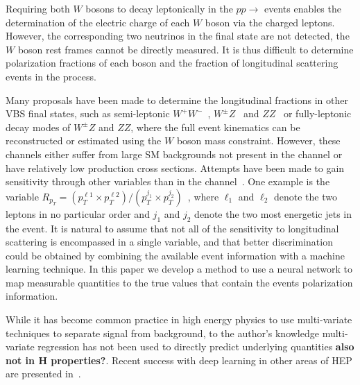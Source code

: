Requiring both $W$ bosons to decay leptonically in the $pp
\to$ \ssWW events enables the determination of the electric charge of
each $W$ boson via the charged leptons. However, the
corresponding two neutrinos in the final state are not detected, the
$W$ boson rest frames cannot be directly measured.  It is thus
difficult to determine polarization fractions of each boson and
the fraction of longitudinal scattering events in the \ssWW process.

Many proposals have been made to determine the longitudinal fractions in other VBS final states, such as semi-leptonic
$W^+W^-$~\cite{Han:2009em}, $W^\pm Z$~\cite{aa} and $ZZ$~\cite{le houche report} or
fully-leptonic decay modes of $W^\pm Z$ and $ZZ$, where the full
event kinematics can be reconstructed or estimated using the $W$ boson mass constraint. 
However, these channels either suffer from large SM backgrounds not present in the \ssWW channel or
have relatively low production cross sections. Attempts have been made
to gain sensitivity through other variables than \ts in the \ssWW
channel~\cite{aaa}. One example is the variable $R_{p_T}=(p_{T}^{\ell 1} \times
p_{T}^{\ell 2}) / (p_T^{j_1} \times p_T^{j_2})$~\cite{Doroba:2012pd},
where $\ell_1$ and $\ell_2$ denote the two leptons in no particular
order and $j_1$ and $j_2$ denote the two most energetic jets in the
event.  It is natural to assume that not all of the sensitivity to
longitudinal scattering is encompassed in a single variable, and that
better discrimination could be obtained by combining the available
event information with a machine learning technique. In this paper we
develop a method to use a neural network to map measurable quantities
to the true \cts values that contain the events polarization information.

While it has become common practice in high energy physics to use
multi-variate techniques to separate signal from background, to the
author's knowledge multi-variate regression has not been used to
directly predict underlying quantities {\bf also not in H
  properties?}.  Recent success with deep learning in other areas of
HEP are presented in~\cite{Baldi:2014kfa,Baldi:2014pta}.

